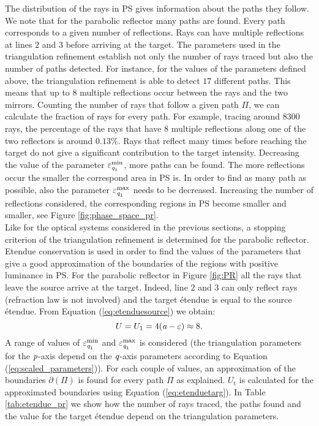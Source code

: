 \begin{figure}[h]
\end{figure} The distribution of the rays in PS gives information about the paths they follow. We note that for the parabolic reflector many paths are found. Every path corresponds to a given number of reflections. Rays can have multiple reflections at lines $2$ and $3$ before arriving at the target. The parameters used in the triangulation refinement establish not only the number of rays traced but also the number of paths detected. For instance, for the values of the parameters defined above, the triangulation refinement is able to detect $17$ different paths. This means that up to $8$ multiple reflections occur between the rays and the two mirrors. Counting the number of rays that follow a given path $\Pi$, we can calculate the fraction of rays for every path. For example, tracing around $8300$ rays, the percentage of the rays that have $8$ multiple reflections along one of the two reflectors is around $0.13\%$. Rays that reflect many times before reaching the target do not give a significant contribution to the target intensity. Decreasing the value of the parameter $\varepsilon_{\textit{q}_1}^{\textrm{min}}$, more paths can be found. The more reflections occur the smaller the correspond area in PS is. In order to find as many path as possible, also the parameter $\varepsilon_{\textit{q}_1}^{\textrm{max}}$ needs to be decreased. Increasing the number of reflections considered, the corresponding regions in PS become smaller and smaller, see Figure \ref{fig:phase_space_pr}. \\ \indent Like for the optical systems considered in the previous sections, a stopping criterion of the triangulation refinement is determined for the parabolic reflector. Etendue conservation is used in order to find the values of the parameters that give a good approximation of the boundaries of the regions with positive luminance in PS. For the parabolic reflector in Figure \ref{fig:PR} all the rays that leave the source arrive at the target. Indeed, line $2$ and $3$ can only reflect rays (refraction law is not involved) and the target \'{e}tendue is equal to the source \'{e}tendue. From Equation (\ref{eq:etenduesource}) we obtain:
\begin{equation}
U = U_1 = 4(\textit{a}-\varepsilon)\approx 8.
\end{equation}
A range of values of $\varepsilon_{\textit{q}_1}^{\textrm{min}}$ and $\varepsilon_{\textit{q}_1}^{\textrm{max}}$ is considered (the triangulation parameters for the $\textit{p}$-axis depend on the $\textit{q}$-axis parameters according to Equation (\ref{eq:scaled_parameters})). For each couple of values, an approximation of the boundaries $\partial$$(\Pi)$ is found for every path $\Pi$ as explained. $U_{\textrm{t}}$ is calculated for the approximated boundaries using Equation (\ref{eq:etenduetarg}). In Table \ref{tab:etendue_pr} we show how the number of rays traced, the paths found and the value for the target \'{e}tendue depend on the triangulation parameters.
